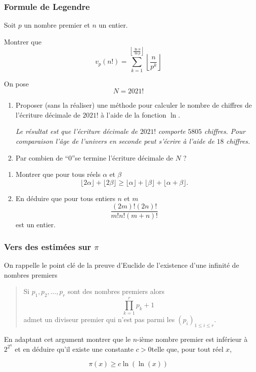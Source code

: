 \subsubsection{Formule de Legendre}

\begin{exo}
Soit $p$ un nombre premier et $n$ un entier.

Montrer que
$$v_p(n!) = \sum_{k=1}^{\left\lfloor \frac{\ln n}{\ln p} \right\rfloor} \left\lfloor \frac n{p^k} \right\rfloor$$
\end{exo}


\begin{exo}
 On pose
$$N = 2021!$$
\begin{enumerate}
\item Proposer (sans la réaliser) une méthode pour calculer le nombre de chiffres de l'écriture décimale de $2021!$ à l'aide de la fonction $\ln$.

\textit{\small Le résultat est que l'écriture décimale de $2021!$ comporte $5805$ chiffres. Pour comparaison l'âge de l'univers en seconde peut s'écrire à l'aide de $18$ chiffres.}
\item Par combien de ``$0$''se termine l'écriture décimale de $N$ ?
\end{enumerate}
\end{exo}


\begin{exo}
\begin{enumerate}
\item Montrer que pour tous réels $\alpha$ et $\beta$
$$\lfloor 2 \alpha \rfloor  + \lfloor  2\beta\rfloor \ge \lfloor \alpha \rfloor + \lfloor \beta \rfloor + \lfloor \alpha + \beta \rfloor. $$
\item En déduire que pour tous entiers $n$ et $m$
$$ \frac{(2m)! (2n)!}{m! n! (m+n)!}$$
est un entier.
\end{enumerate}
\end{exo}

\subsubsection{Vers des estimées sur $\pi$}

\begin{exo}
On rappelle le point clé de la preuve d'Euclide de l'existence d'une infinité de nombres premiers
\begin{quote}
Si $p_1, p_2, \ldots, p_r$ sont des nombres premiers alors
$$\prod_{k=1}^r p_k +1$$
admet un diviseur premier qui n'est pas parmi les $(p_i)_{1 \le i \le r}$.


\end{quote}
En adaptant cet argument montrer que le $n$-ième nombre premier est inférieur à $2^{2^n}$ et en déduire qu'il existe une constante $c>0$telle que, pour tout réel $x$,

$$\pi(x) \ge c \ln(\ln(x))$$
\end{exo}



